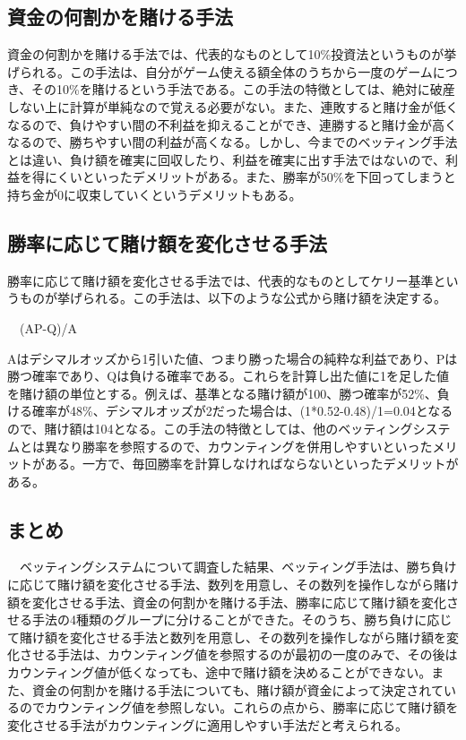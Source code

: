\subsection{資金の何割かを賭ける手法}
資金の何割かを賭ける手法では、代表的なものとして10\%投資法というものが挙げられる。この手法は、自分がゲーム使える額全体のうちから一度のゲームにつき、その10\%を賭けるという手法である。この手法の特徴としては、絶対に破産しない上に計算が単純なので覚える必要がない。また、連敗すると賭け金が低くなるので、負けやすい間の不利益を抑えることができ、連勝すると賭け金が高くなるので、勝ちやすい間の利益が高くなる。しかし、今までのベッティング手法とは違い、負け額を確実に回収したり、利益を確実に出す手法ではないので、利益を得にくいといったデメリットがある。また、勝率が50\%を下回ってしまうと持ち金が0に収束していくというデメリットもある。

\subsection{勝率に応じて賭け額を変化させる手法}
勝率に応じて賭け額を変化させる手法では、代表的なものとしてケリー基準というものが挙げられる。この手法は、以下のような公式から賭け額を決定する。
\begin{center}　(AP-Q)/A　
\end{center}
Aはデシマルオッズから1引いた値、つまり勝った場合の純粋な利益であり、Pは勝つ確率であり、Qは負ける確率である。これらを計算し出た値に1を足した値を賭け額の単位とする。例えば、基準となる賭け額が100、勝つ確率が52\%、負ける確率が48\%、デシマルオッズが2だった場合は、(1*0.52-0.48)/1=0.04となるので、賭け額は104となる。この手法の特徴としては、他のベッティングシステムとは異なり勝率を参照するので、カウンティングを併用しやすいといったメリットがある。一方で、毎回勝率を計算しなければならないといったデメリットがある。
\subsection{まとめ}
　ベッティングシステムについて調査した結果、ベッティング手法は、勝ち負けに応じて賭け額を変化させる手法、数列を用意し、その数列を操作しながら賭け額を変化させる手法、資金の何割かを賭ける手法、勝率に応じて賭け額を変化させる手法の4種類のグループに分けることができた。そのうち、勝ち負けに応じて賭け額を変化させる手法と数列を用意し、その数列を操作しながら賭け額を変化させる手法は、カウンティング値を参照するのが最初の一度のみで、その後はカウンティング値が低くなっても、途中で賭け額を決めることができない。また、資金の何割かを賭ける手法についても、賭け額が資金によって決定されているのでカウンティング値を参照しない。これらの点から、勝率に応じて賭け額を変化させる手法がカウンティングに適用しやすい手法だと考えられる。

